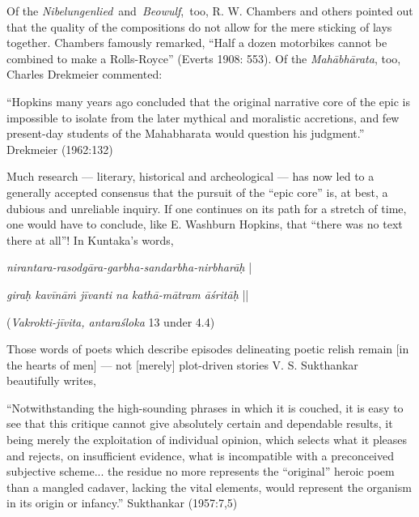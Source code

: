 Of the {\sl Nibelungenlied} and {\sl Beowulf}, too, R. W. Chambers and others pointed out that the quality of the compositions do not allow for the mere sticking of lays together. Chambers famously remarked, “Half a dozen motorbikes cannot be combined to make a Rolls-Royce” (Everts 1908: 553). Of the {\sl Mahābhārata}, too, Charles Drekmeier commented:

\begin{myquote}
“Hopkins many years ago concluded that the original narrative core of the epic is impossible to isolate from the later mythical and moralistic accretions, and few present-day students of the Mahabharata would question his judgment.”
\hfill Drekmeier (1962:132)
\end{myquote}

Much research --- literary, historical and archeological --- has now led to a generally accepted consensus that the pursuit of the “epic core” is, at best, a dubious and unreliable inquiry. If one continues on its path for a stretch of time, one would have to conclude, like E. Washburn Hopkins, that “there was no text there at all”! In Kuntaka's words, 

\begin{myquote}
{{\sl nirantara-rasodgāra-garbha-sandarbha-nirbharāḥ}} |

{\sl giraḥ kavīnāṁ jīvanti na kathā-mātram āśritāḥ} || 

\hfill({\sl Vakrokti-jīvita, antaraśloka} 13 under 4.4)
\end{myquote}

Those words of poets which describe episodes delineating poetic relish remain [in the hearts of men] --- not [merely] plot-driven stories V. S. Sukthankar beautifully writes, 

\begin{myquote}
“Notwithstanding the high-sounding phrases in which it is couched, it is easy to see that this critique cannot give absolutely certain and dependable results, it being merely the exploitation of individual opinion, which selects what it pleases and rejects, on insufficient evidence, what is incompatible with a preconceived subjective scheme... the residue no more represents the “original” heroic poem than a mangled cadaver, lacking the vital elements, would represent the organism in its origin or infancy.”
\hfill Sukthankar (1957:7,5)\\[-.6cm]
\end{myquote}


